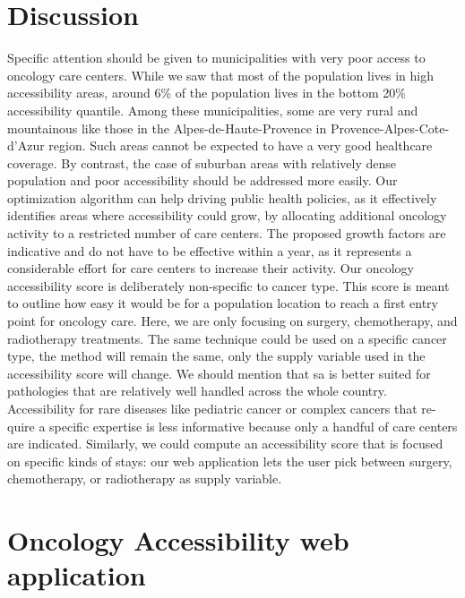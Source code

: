 \section{Discussion}

Specific attention should be given to municipalities with very poor access to oncology care centers. While we saw that most of the population lives in high accessibility areas, around 6\% of the population lives in the bottom 20\% accessibility quantile. Among these municipalities, some are very rural and mountainous like those in the Alpes-de-Haute-Provence in Provence-Alpes-Cote-d'Azur region. Such areas cannot be expected to have a very good healthcare coverage. By contrast, the case of suburban areas with relatively dense population and poor accessibility should be addressed more easily. Our optimization algorithm can help driving public health policies, as it effectively identifies areas where accessibility could grow, by allocating additional oncology activity to a restricted number of care centers. The proposed growth factors are indicative and do not have to be effective within a year, as it represents a considerable effort for care centers to increase their activity.
Our oncology accessibility score is deliberately non-specific to cancer type. This score is meant to outline how easy it would be for a population location to reach a first entry point for oncology care. Here, we are only focusing on surgery, chemotherapy, and radiotherapy treatments. The same technique could be used on a specific cancer type, the method will remain the same, only the supply variable used in the accessibility score will change. We should mention that \ac{sa} is better suited for pathologies that are relatively well handled across the whole country. Accessibility for rare diseases like pediatric cancer or complex cancers that re-quire a specific expertise is less informative because only a handful of care centers are indicated.
Similarly, we could compute an accessibility score that is focused on specific kinds of stays: our web application lets the user pick between surgery, chemotherapy, or radiotherapy as supply variable.

\section{Oncology Accessibility web application}

